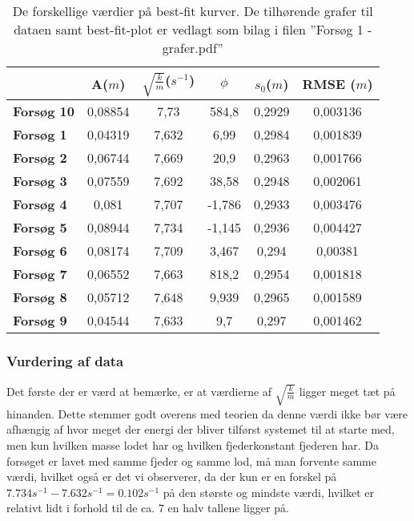 \begin{table}
\centering
\begin{tabular}{|l|c|c|c|c|c|}
\hline
\textbf{}          & \textbf{A}($m$) & \textbf{$\sqrt{\frac{k}{m}}$}($s^{-1}$) & \textbf{$\phi$} & \textbf{$s_0$}($m$) & \textbf{RMSE }($m$) \\ \hline
\textbf{Forsøg 10} & 0,08854    & 7,73                          & 584,8           & 0,2929         & 0,003136      \\ \hline
\textbf{Forsøg 1}  & 0,04319    & 7,632                         & 6,99            & 0,2984         & 0,001839      \\ \hline
\textbf{Forsøg 2}  & 0,06744    & 7,669                         & 20,9            & 0,2963         & 0,001766      \\ \hline
\textbf{Forsøg 3}  & 0,07559    & 7,692                         & 38,58           & 0,2948         & 0,002061      \\ \hline
\textbf{Forsøg 4}  & 0,081      & 7,707                         & -1,786          & 0,2933         & 0,003476      \\ \hline
\textbf{Forsøg 5}  & 0,08944    & 7,734                         & -1,145          & 0,2936         & 0,004427      \\ \hline
\textbf{Forsøg 6}  & 0,08174    & 7,709                         & 3,467           & 0,294          & 0,00381       \\ \hline
\textbf{Forsøg 7}  & 0,06552    & 7,663                         & 818,2           & 0,2954         & 0,001818      \\ \hline
\textbf{Forsøg 8}  & 0,05712    & 7,648                         & 9,939           & 0,2965         & 0,001589      \\ \hline
\textbf{Forsøg 9}  & 0,04544    & 7,633                         & 9,7             & 0,297          & 0,001462      \\ \hline
\end{tabular}

\caption{De forskellige værdier på best-fit kurver. De tilhørende grafer til dataen samt best-fit-plot er vedlagt som bilag i filen ''Forsøg 1 - grafer.pdf''}
\label{tabel: bestfitkurver forsog 1}
\end{table}

\subsubsection{Vurdering af data}
Det første der er værd at bemærke, er at værdierne af $\sqrt{\frac{k}{m}}$ ligger meget tæt på hinanden. 
Dette stemmer godt overens med teorien da denne værdi ikke bør være afhængig af hvor meget der energi der bliver tilførst systemet til at starte med, men kun hvilken masse lodet har og hvilken fjederkonstant fjederen har. 
Da forsøget er lavet med samme fjeder og samme lod, må man forvente samme værdi, hvilket også er det vi observerer, da der kun er en forskel på $7.734s^{-1}-7.632s^{-1}=0.102s^{-1}$ på den største og mindste værdi, hvilket er relativt lidt i forhold til de ca. 7 en halv tallene ligger på.




